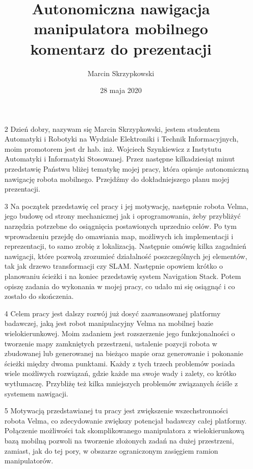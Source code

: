 \documentclass[20pt,a4paper]{article}
\date{28 maja 2020}
\author{Marcin Skrzypkowski}
\title{Autonomiczna nawigacja manipulatora mobilnego \\ komentarz do prezentacji}
\begin{document}
\maketitle
\pagebreak

	\begin{itemize}
		\item [2] Dzień dobry, nazywam się Marcin Skrzypkowski, jestem studentem Automatyki i Robotyki na Wydziale Elektroniki i Technik Informacyjnych, 
moim promotorem jest dr hab. inż. Wojciech Szynkiewicz z Instytutu Automatyki i Informatyki Stosowanej. Przez następne kilkadziesiąt minut przedstawię Państwu bliżej tematykę mojej pracy, która opisuje autonomiczną nawigację robota mobilnego. Przejdźmy do dokładniejszego planu mojej prezentacji.

    \item[3]
    Na początek przedstawię cel pracy i jej motywację, następnie robota Velma, jego budowę od strony mechanicznej jak i oprogramowania,
      żeby przybliżyć narzędzia potrzebne do osiągnięcia postawionych uprzednio celów.
      Po tym wprowadzeniu przejdę do omawiania map, możliwych ich implementacji i reprezentacji,
      to samo zrobię z lokalizacją.
      Następnie omówię kilka zagadnień nawigacji, które pozwolą zrozumieć działalność poszczególnych jej elementów, tak jak drzewo transformacji czy SLAM.
      Następnie opowiem krótko o planowaniu ścieżki i na koniec przedstawię system Navigation Stack.
      Potem opiszę zadania do wykonania w mojej pracy, co udało mi się osiągnąć i co zostało do skończenia.
	 \item [4]  Celem pracy jest dalszy rozwój już dosyć zaawansowanej platformy badawczej, jaką jest robot manipulacyjny Velma na mobilnej bazie wielokierunkowej.
	      Moim zadaniem jest rozszerzenie jego funkcjonalności o tworzenie mapy zamkniętych przestrzeni, ustalenie pozycji robota w zbudowanej lub generowanej na bieżąco mapie oraz generowanie i pokonanie ścieżki między dwoma punktami.
    Każdy z tych trzech problemów posiada wiele możliwych rozwiązań, gdzie każde ma swoje wady i zalety, co krótko wytłumaczę. Przybliżę też kilka mniejszych problemów związanych ściśle z systemem nawigacji.   
    \item[5] Motywacją przedstawianej tu pracy jest zwiększenie wszechstronności robota Velma, co zdecydowanie zwiększy potencjał badawczy całej platformy. 
    Połączenie możliwości tak skomplikowanego manipulatora z wielokierunkową bazą mobilną pozwoli na tworzenie złożonych zadań na dużej przestrzeni, zamiast, jak do tej pory, w obszarze ograniczonym zasięgiem ramion manipulatorów.

\end{itemize}
\end{document}
